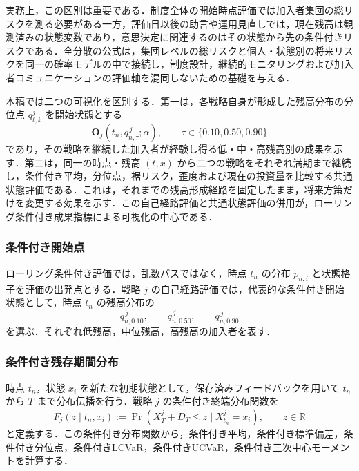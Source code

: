\documentclass[10pt,a4paper]{article}
\theoremstyle{plain}
\theoremstyle{definition}
\newcommand{\R}{\mathbb{R}}
\begin{document}
実務上，この区別は重要である．制度全体の開始時点評価では加入者集団の総リスクを測る必要がある一方，評価日以後の助言や運用見直しでは，現在残高は観測済みの状態変数であり，意思決定に関連するのはその状態から先の条件付きリスクである．全分散の公式は，集団レベルの総リスクと個人・状態別の将来リスクを同一の確率モデルの中で接続し，制度設計，継続的モニタリングおよび加入者コミュニケーションの評価軸を混同しないための基礎を与える．

本稿では二つの可視化を区別する．第一は，各戦略自身が形成した残高分布の分位点 $q_{t,k}^{j}$ を開始状態とする
\begin{equation}
  \mathbf O_j\!\left(t_n,q_{n,\tau}^{\,j};\alpha\right),
  \qquad \tau\in\{0.10,0.50,0.90\}
  \label{eq:self-path-rolling-profile}
\end{equation}
であり，その戦略を継続した加入者が経験し得る低・中・高残高別の成果を示す．第二は，同一の時点・残高 $(t,x)$ から二つの戦略をそれぞれ満期まで継続し，条件付き平均，分位点，裾リスク，歪度および現在の投資量を比較する共通状態評価である．これは，それまでの残高形成経路を固定したまま，将来方策だけを変更する効果を示す．この自己経路評価と共通状態評価の併用が，ローリング条件付き成果指標による可視化の中心である．

\subsubsection{条件付き開始点}

ローリング条件付き評価では，乱数パスではなく，時点 $t_n$ の分布 $p_{n,i}$ と状態格子を評価の出発点とする．戦略 $j$ の自己経路評価では，代表的な条件付き開始状態として，時点 $t_n$ の残高分布の
\begin{equation}
  q_{n,0.10}^{\,j},\qquad q_{n,0.50}^{\,j},\qquad q_{n,0.90}^{\,j}
  \label{eq:rolling-quantiles}
\end{equation}
を選ぶ．それぞれ低残高，中位残高，高残高の加入者を表す．

\subsubsection{条件付き残存期間分布}

時点 $t_n$，状態 $x_i$ を新たな初期状態として，保存済みフィードバックを用いて $t_n$ から $T$ まで分布伝播を行う．戦略 $j$ の条件付き終端分布関数を
\begin{equation}
  F_j(z\mid t_n,x_i)
  :=\Pr\!\left(X_T^j+D_T\leq z\mid X_{t_n}^j=x_i\right),
  \qquad z\in\R
  \label{eq:conditional-terminal-law}
\end{equation}
と定義する．この条件付き分布関数から，条件付き平均，条件付き標準偏差，条件付き分位点，条件付きLCVaR，条件付きUCVaR，条件付き三次中心モーメントを計算する．
\end{document}
